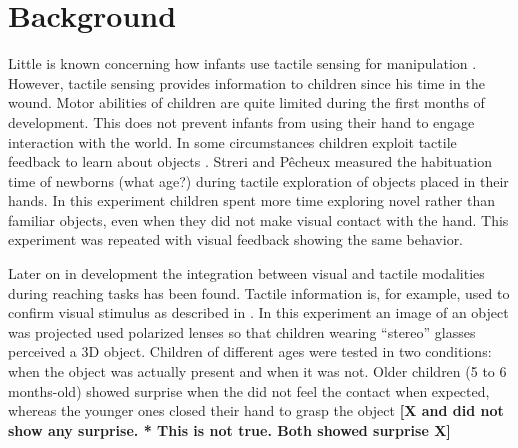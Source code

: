 \section{Background}
\label{sec:background}

Little is known concerning how infants use tactile sensing for
manipulation \cite{streri93Seeing}.
However, tactile sensing provides information to children since
his time in the wound. Motor abilities of children are quite
limited during the first months of development. This does not
prevent infants from using their hand to engage interaction
with the world.
In some circumstances children exploit tactile feedback to learn
about objects \cite{streri86Habituation}.
Streri and P\^{e}cheux measured the habituation time of newborns
(what age?) during tactile exploration of objects placed in their hands.
In this experiment children spent more time exploring novel rather than familiar
objects, even when they did not make visual contact with the hand. This experiment
was repeated with visual feedback showing the same behavior.

Later on in development the integration between visual and tactile
modalities during reaching tasks has been found. Tactile
information is, for example, used to confirm visual stimulus as
described in \cite{bower70Coordination}. In this experiment an
image of an object was projected used polarized lenses so that
children wearing ``stereo'' glasses perceived a 3D object.
Children of different ages were tested in two conditions: when the
object was actually present and when it was not. Older children (5
to 6 months-old) showed surprise when the did not feel the contact
when expected, whereas the younger ones closed their hand to grasp
the object \textbf{[X and  did not show any surprise. * This is
not true. Both showed surprise X]}

